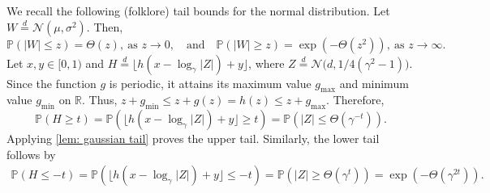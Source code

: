 \documentclass[11pt]{article}
\newcommand{\Prob}{\mathbb{P}}
\numberwithin{theorem}{section}
\begin{document}
We recall the following (folklore) tail bounds for the normal distribution. Let~$W\stackrel{d}{=} \mathcal{N}(\mu,\sigma^2)$. Then,
\begin{equation}\label{lem: gaussian tail}
\Prob(|W|\leq z) = \Theta(z), \ \text{as } z\to 0,
\quad\text{and}\quad
\Prob(|W|\geq z) =\exp\left(-\Theta\left(z^2\right)\right), \ \text{as } z\to \infty.
\end{equation}
Let $x,y\in [0,1)$ and $H\stackrel{d}{=}\lfloor h(x-\log_\gamma|Z|) + y\rfloor$, where $Z \stackrel{d}{=} \mathcal{N}\big(d,1/4(\gamma^2-1)\big)$. Since the function $g$ is periodic, it attains its maximum value $g_{\text{max}}$ and minimum value $g_{\text{min}}$ on $\mathbb{R}$. Thus, $z+g_{\text{min}}\leq z+g(z)=h(z) \leq z+g_{\text{max}}$. Therefore, 
\[
\Prob(H\geq t)=\Prob(\lfloor h(x-\log_\gamma|Z|) + y\rfloor\geq t) = \Prob\left(|Z|\leq \Theta\left(\gamma^{-t}\right)\right).
\]
Applying \eqref{lem: gaussian tail} proves the upper tail. Similarly, the lower tail follows by
\begin{align*}
    \Prob(H\leq -t) = \Prob\left(\lfloor h(x-\log_\gamma|Z|) + y\rfloor\leq -t\right) = \Prob\left(|Z|\geq \Theta\left(\gamma^{t}\right)\right) = \exp\left(-\Theta\left(\gamma^{2t}\right)\right).
\end{align*}
\end{document}

